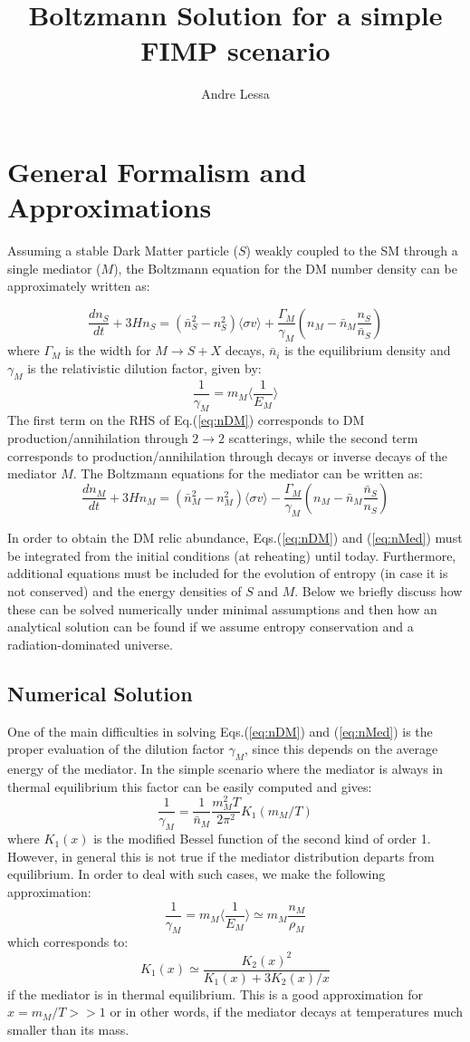 \documentclass{article}
\title{Boltzmann Solution for a simple FIMP scenario}
\author{Andre Lessa}
\def\to{\rightarrow}
\def\be{\begin{equation}}
\def\ee{\end{equation}}
\def\to{\rightarrow}
\newcommand\Drv[2]{\frac{d #1}{d #2}}
\begin{document}
\section{General Formalism and Approximations}

Assuming a stable Dark Matter particle ($S$) weakly coupled to the SM through a single mediator ($M$),
the Boltzmann equation for the DM number density can be approximately written as:

\be
\Drv{n_{S}}{t} + 3H n_S  =  \left( \bar{n}_S^2 - n_S^2 \right) \langle \sigma v \rangle 
+  \frac{\Gamma_M}{\gamma_M} \left(n_M - \bar{n}_M \frac{n_S}{\bar{n}_S} \right)  \label{eq:nDM}
\ee
where $\Gamma_M $ is the width for $M \to S + X$ decays, $\bar{n}_i$ is the equilibrium density and $\gamma_M$ is
the relativistic dilution factor, given by:
\be
\frac{1}{\gamma_M} = m_M \langle \frac{1}{E_M} \rangle \label{eq:gamma}
\ee
The first term on the RHS of Eq.(\ref{eq:nDM}) corresponds to DM production/annihilation through $2 \to 2$ scatterings, while the second term corresponds
to production/annihilation through decays or inverse decays of the mediator $M$.
The Boltzmann equations for the mediator can be written as:
\be
\Drv{n_{M}}{t} + 3H n_M  =  \left( \bar{n}_M^2 - n_M^2 \right) \langle \sigma v \rangle 
- \frac{\Gamma_M}{\gamma_M} \left(n_M - \bar{n}_M \frac{\bar{n}_S}{n_S} \right) \label{eq:nMed}
\ee


In order to obtain the DM relic abundance, Eqs.(\ref{eq:nDM}) and (\ref{eq:nMed}) must be integrated
from the initial conditions (at reheating) until today. Furthermore, additional equations
must be included for the evolution of entropy (in case it is not conserved) and the
energy densities of $S$ and $M$. Below we briefly discuss how these can be solved numerically
under minimal assumptions and then how an analytical solution can be found if we assume entropy conservation
and a radiation-dominated universe.

\subsection{Numerical Solution} \label{sec:num}

One of the main difficulties in solving Eqs.(\ref{eq:nDM}) and (\ref{eq:nMed}) is the proper evaluation
of the dilution factor $\gamma_M$, since this depends on the average energy of the mediator.
In the simple scenario where the mediator is always in thermal equilibrium this factor can be easily
computed and gives:
\be
\frac{1}{\gamma_M} = \frac{1}{\bar{n}_M} \frac{m_M^2 T}{2\pi^2} K_1\left(m_M/T\right) \label{eq:gamma}
\ee
where $K_1(x)$ is the modified Bessel function of the second kind of order 1.
However, in general this is not true if the mediator distribution departs from equilibrium.
In order to deal with such cases, we make the following approximation:
\be
\frac{1}{\gamma_M} = m_M \langle \frac{1}{E_M} \rangle \simeq  m_M \frac{n_M}{\rho_M}
\ee
which corresponds to:
\be
K_1(x) \simeq \frac{K_2(x)^2}{K_1(x) + 3 K_2(x)/x}
\ee
if the mediator is in thermal equilibrium. This is a good approximation for $x = m_M/T >> 1$
or in other words, if the mediator decays at temperatures much smaller than its mass.
\end{document}
